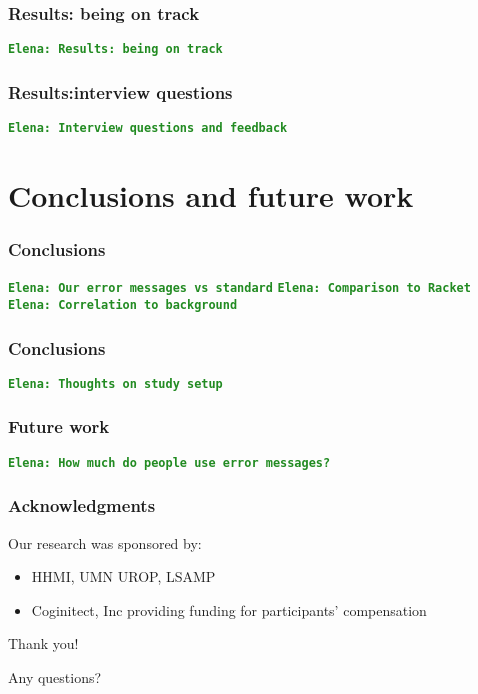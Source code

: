 \documentclass{beamer}
\newcommand{\comment}[1]{{\bf \tt  {#1}}}
\newcommand{\emcomment}[1]{\textcolor{ForestGreen}{\comment{Elena: {#1}}}}
\begin{document}
\begin{frame}
\frametitle{Results: being on track}
\emcomment{Results: being on track}
\end{frame}

\begin{frame}
\frametitle{Results:interview questions}
\emcomment{Interview questions and feedback}
\end{frame}

\section{Conclusions and future work}

\frametitle{Conclusions}
\begin{frame}
\emcomment{Our error messages vs standard}
\emcomment{Comparison to Racket}
\emcomment{Correlation to background}
\end{frame}

\begin{frame}
\frametitle{Conclusions}
\emcomment{Thoughts on study setup}
\end{frame}

\begin{frame}
\frametitle{Future work}
\emcomment{How much do people use error messages?}
\end{frame}

\begin{frame}
\frametitle{Acknowledgments}
	Our research was sponsored by:
	\begin{itemize}
	\item HHMI, UMN UROP, LSAMP
        \item Coginitect, Inc providing funding for participants' compensation 
	\end{itemize}
	{\centering
	\noindent
	Thank you! \par
	Any questions? \par
	}
\end{frame}
\end{document}
